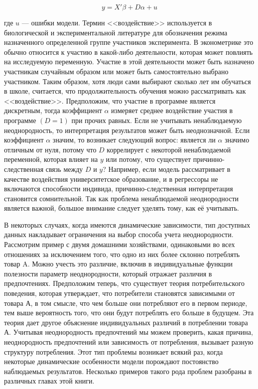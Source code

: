 \begin{equation}
y=X'\beta+D\alpha+u
\end{equation}


где $u$ --- ошибки модели. Термин <<воздействие>> используется в биологической и экспериментальной литературе для обозначения режима назначенного определенной группе участников эксперимента. 
В эконометрике это обычно относится к участию в какой-либо деятельности, которая может повлиять на исследуемую переменную. 
Участие в этой деятельности может быть назначено  участникам случайным образом или может быть самостоятельно выбрано участником. 
Таким образом, хотя  люди сами выбирают сколько лет им обучаться в школе, считается, что продолжительность обучения можно рассматривать как <<воздействие>>. 
Предположим, что участие в программе является дискретным, тогда коэффициент $\alpha$ измеряет среднее воздействие участия в программе $(D = 1)$ при прочих равных. 
Если не учитывать ненаблюдаемую неоднородность, то интерпретация результатов может быть неоднозначной. 
Если коэффициент $\alpha$ значим, то возникает следующий вопрос: является ли $\alpha$ значимо отличным от нуля, потому что $D$ коррелирует с некоторой ненаблюдаемой переменной, которая влияет на $y$ или потому, что существует причинно-следственная связь между $D$ и $y$? 
Например, если модель рассматривает в качестве воздействия университетское образование, и в регрессоры не включаются способности индивида, причинно-следственная интерпретация становится сомнительной. Так как проблема ненаблюдаемой неоднородности является важной, большое внимание следует уделять тому, как её учитывать. 


В некоторых случаях, когда имеются динамические зависимости, тип доступных данных накладывает  ограничения на выбор способа учета неоднородности. 
Рассмотрим пример с двумя домашними хозяйствами, одинаковыми во всех отношениях за исключением того, что одно из них более склонно потреблять товар A. 
Можно учесть это различие, включив в  индивидуальные функции полезности параметр неоднородности, который отражает различия в предпочтениях. 
Предположим теперь, что существует теория потребительского поведения, которая утверждает, что потребители становятся зависимыми от товара А, в том смысле, что чем больше они потребляют его в первом периоде, тем выше вероятность того, что они будут потреблять его больше в будущем. Эта теория дает другое объяснение индивидуальных различий в потреблении товара А. Учитывая неоднородность предпочтений мы можем проверить, какая причина, неоднородность предпочтений или зависимость от потребления, вызывает разную структуру потребления. 
Этот тип проблемы возникает всякий раз, когда некоторые динамические особенности модели порождают постоянство  наблюдаемых результатов. Несколько примеров такого рода проблем разобраны в различных главах этой книги.
	
